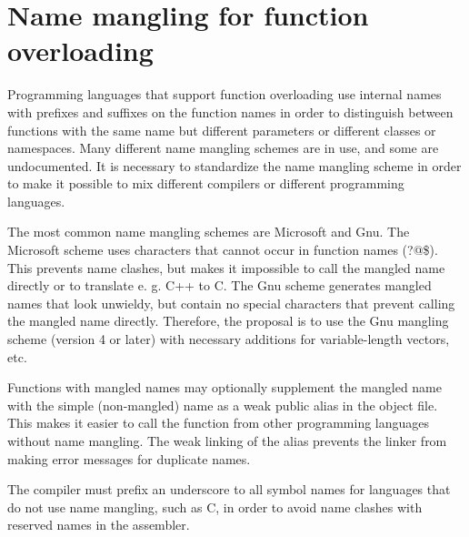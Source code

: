 \documentclass[forwardcom.tex]{subfiles}
\begin{document}
\section{Name mangling for function overloading} \label{nameMangling}
Programming languages that support function overloading use internal names with prefixes and suffixes on the function names in order to distinguish between functions with the same name but different parameters or different classes or namespaces. Many different name mangling schemes are in use, and some are undocumented. It is necessary to standardize the name mangling scheme in order to make it possible to mix different compilers or different programming languages.
\vv

The most common name mangling schemes are Microsoft and Gnu. The Microsoft scheme uses characters that cannot occur in function names (?@\$). This prevents name clashes, but makes it impossible to call the mangled name directly or to translate e. g. C++ to C. The Gnu scheme generates mangled names that look unwieldy, but contain no special characters that prevent calling the mangled name directly. Therefore, the proposal is to use the Gnu mangling scheme (version 4 or later) with necessary additions for variable-length vectors, etc. 
\vv

Functions with mangled names may optionally supplement the mangled name with the simple (non-mangled) name as a weak public alias in the object file. This makes it easier to call the function from other programming languages without name mangling. The weak linking of the alias prevents the linker from making error messages for duplicate names.
\vv

The compiler must prefix an underscore to all symbol names for languages that do not use name mangling, such as C, in order to avoid name clashes with reserved names in the assembler.
\vv
\end{document}
